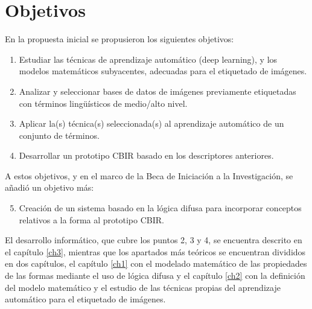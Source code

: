 \section{Objetivos}

En la propuesta inicial se propusieron los siguientes objetivos:

\begin{enumerate}
\item Estudiar las técnicas de aprendizaje automático (deep learning), y los modelos matemáticos subyacentes, adecuadas para el etiquetado de imágenes.
\item Analizar y seleccionar bases de datos de imágenes previamente etiquetadas con términos lingüísticos de medio/alto nivel.
\item Aplicar la(s) técnica(s) seleccionada(s) al aprendizaje automático de un conjunto de términos.
\item Desarrollar un prototipo CBIR basado en los descriptores anteriores.
\end{enumerate}

A estos objetivos, y en el marco de la Beca de Iniciación a la Investigación, se añadió un objetivo más:
\begin{enumerate}
  \setcounter{enumi}{4}
  \item Creación de un sistema basado en la lógica difusa para incorporar conceptos relativos a la forma al prototipo CBIR.\\
\end{enumerate}

El desarrollo informático, que cubre los puntos 2, 3 y 4, se encuentra descrito en el capítulo \ref{ch3}, mientras que los apartados más teóricos se encuentran divididos en dos capítulos, el capítulo \ref{ch1} con el modelado matemático de las propiedades de las formas mediante el uso de lógica difusa y el capítulo \ref{ch2} con la definición del modelo matemático y el estudio de las técnicas propias del aprendizaje automático para el etiquetado de imágenes.\\